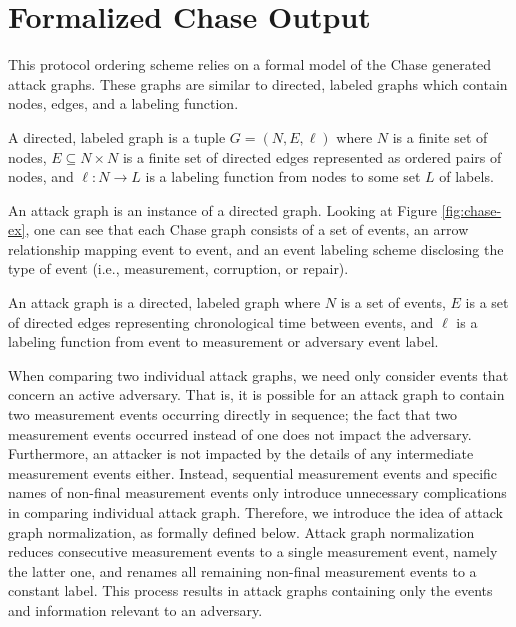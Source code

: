 \documentclass[runningheads]{llncs}
\theoremstyle{definition}
\begin{document}
\section{Formalized Chase Output}

This protocol ordering scheme relies on a formal model of the Chase generated attack graphs. These graphs are similar to directed, labeled graphs which contain nodes, edges, and a labeling function. 

\begin{definition}[Graph]
    A directed, labeled graph is a tuple $G = (N, E, \ell)$ where $N$ is a finite set of nodes, $E \subseteq N \times N$ is a finite set of directed edges represented as ordered pairs of nodes, and $\ell : N \rightarrow L$ is a labeling function from nodes to some set $L$ of labels. 
\end{definition}
 
An attack graph is an instance of a directed graph. Looking at Figure \ref{fig:chase-ex}, one can see that each Chase graph consists of a set of events, an arrow relationship mapping event to event, and an event labeling scheme disclosing the type of event (i.e., measurement, corruption, or repair).

\begin{definition}
    An attack graph is a directed, labeled graph where $N$ is a set of events, $E$ is a set of directed edges representing chronological time between events, and $\ell$ is a labeling function from event to measurement or adversary event label.
\end{definition}

When comparing two individual attack graphs, we need only consider events that concern an active adversary. That is, it is possible for an attack graph to contain two measurement events occurring directly in sequence; the fact that two measurement events occurred instead of one does not impact the adversary. Furthermore, an attacker is not impacted by the details of any intermediate measurement events either. Instead, sequential measurement events and specific names of non-final measurement events only introduce unnecessary complications in comparing individual attack graph. Therefore, we introduce the idea of attack graph normalization, as formally defined below. Attack graph normalization reduces consecutive measurement events to a single measurement event, namely the latter one, and renames all remaining non-final measurement events to a constant label. This process results in attack graphs containing only the events and information relevant to an adversary. 
\end{document}
